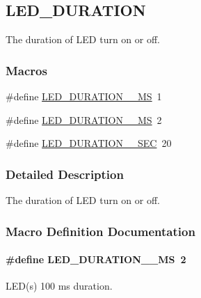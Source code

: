 \hypertarget{group___l_e_d___d_u_r_a_t_i_o_n}{}\subsection{L\+E\+D\+\_\+\+D\+U\+R\+A\+T\+I\+ON}
\label{group___l_e_d___d_u_r_a_t_i_o_n}


The duration of L\+ED turn on or off.  


\subsubsection*{Macros}
\begin{DoxyCompactItemize}
\item 
\#define \hyperlink{group___l_e_d___d_u_r_a_t_i_o_n_gaf1b42602c53caa057f13952e22e4d6e3}{L\+E\+D\+\_\+\+D\+U\+R\+A\+T\+I\+O\+N\+\_\+\_\+\+MS}~1
\item 
\#define \hyperlink{group___l_e_d___d_u_r_a_t_i_o_n_gad645bf576360942b2bd747b16424f382}{L\+E\+D\+\_\+\+D\+U\+R\+A\+T\+I\+O\+N\+\_\+\_\+\+MS}~2
\item 
\#define \hyperlink{group___l_e_d___d_u_r_a_t_i_o_n_ga4e0c21d86f8b49598f3acde13a361f4d}{L\+E\+D\+\_\+\+D\+U\+R\+A\+T\+I\+O\+N\+\_\+\_\+\+S\+EC}~20
\end{DoxyCompactItemize}


\subsubsection{Detailed Description}
The duration of L\+ED turn on or off. 



\subsubsection{Macro Definition Documentation}
\paragraph[{\texorpdfstring{L\+E\+D\+\_\+\+D\+U\+R\+A\+T\+I\+O\+N\+\_\+100\+\_\+\+MS}{LED_DURATION_100_MS}}]{\setlength{\rightskip}{0pt plus 5cm}\#define L\+E\+D\+\_\+\+D\+U\+R\+A\+T\+I\+O\+N\+\_\+\_\+\+MS~2}\hypertarget{group___l_e_d___d_u_r_a_t_i_o_n_gad645bf576360942b2bd747b16424f382}{}\label{group___l_e_d___d_u_r_a_t_i_o_n_gad645bf576360942b2bd747b16424f382}
L\+E\+D(s) 100 ms duration. 
